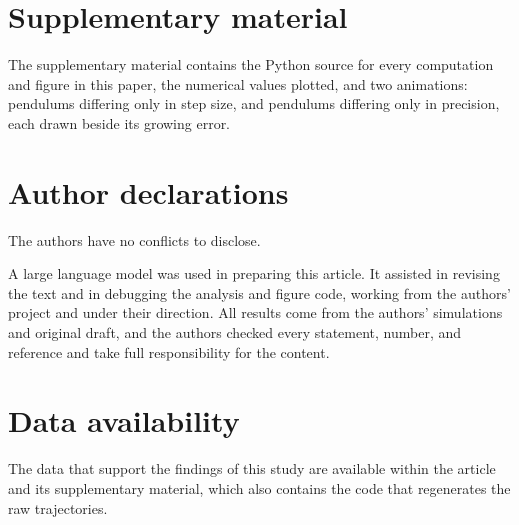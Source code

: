 \documentclass[prb,reprint,amsmath,amssymb,longbibliography]{revtex4-1}
\begin{document}
\section*{Supplementary material}
The supplementary material contains the Python source for every computation and
figure in this paper, the numerical values plotted, and two animations: pendulums
differing only in step size, and pendulums differing only in precision, each
drawn beside its growing error.

\section*{Author declarations}
The authors have no conflicts to disclose.

A large language model was used in preparing this article. It assisted in
revising the text and in debugging the analysis and
figure code, working from the authors' project and under their direction. All
results come from the authors' simulations and original draft, and the authors checked every
statement, number, and reference and take full responsibility for the content.

\section*{Data availability}
The data that support the findings of this study are available within the
article and its supplementary material, which also contains the code that
regenerates the raw trajectories.


\end{document}
